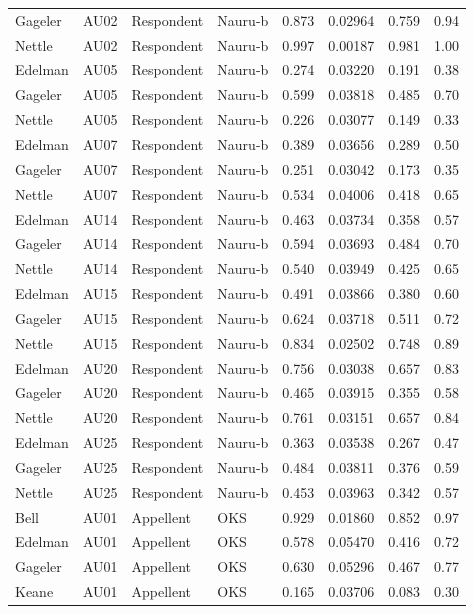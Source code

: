 \documentclass{monashthesis}
\begin{document}
\begin{center}
\begin{longtable}{llllllll}
Gageler & AU02 & Respondent & Nauru-b & 0.873 & 0.02964 & 0.759 & 0.94 \\
Nettle & AU02 & Respondent & Nauru-b & 0.997 & 0.00187 & 0.981 & 1.00 \\
Edelman & AU05 & Respondent & Nauru-b & 0.274 & 0.03220 & 0.191 & 0.38 \\
Gageler & AU05 & Respondent & Nauru-b & 0.599 & 0.03818 & 0.485 & 0.70 \\
Nettle & AU05 & Respondent & Nauru-b & 0.226 & 0.03077 & 0.149 & 0.33 \\
Edelman & AU07 & Respondent & Nauru-b & 0.389 & 0.03656 & 0.289 & 0.50 \\
Gageler & AU07 & Respondent & Nauru-b & 0.251 & 0.03042 & 0.173 & 0.35 \\
Nettle & AU07 & Respondent & Nauru-b & 0.534 & 0.04006 & 0.418 & 0.65 \\
Edelman & AU14 & Respondent & Nauru-b & 0.463 & 0.03734 & 0.358 & 0.57 \\
Gageler & AU14 & Respondent & Nauru-b & 0.594 & 0.03693 & 0.484 & 0.70 \\
Nettle & AU14 & Respondent & Nauru-b & 0.540 & 0.03949 & 0.425 & 0.65 \\
Edelman & AU15 & Respondent & Nauru-b & 0.491 & 0.03866 & 0.380 & 0.60 \\
Gageler & AU15 & Respondent & Nauru-b & 0.624 & 0.03718 & 0.511 & 0.72 \\
Nettle & AU15 & Respondent & Nauru-b & 0.834 & 0.02502 & 0.748 & 0.89 \\
Edelman & AU20 & Respondent & Nauru-b & 0.756 & 0.03038 & 0.657 & 0.83 \\
Gageler & AU20 & Respondent & Nauru-b & 0.465 & 0.03915 & 0.355 & 0.58 \\
Nettle & AU20 & Respondent & Nauru-b & 0.761 & 0.03151 & 0.657 & 0.84 \\
Edelman & AU25 & Respondent & Nauru-b & 0.363 & 0.03538 & 0.267 & 0.47 \\
Gageler & AU25 & Respondent & Nauru-b & 0.484 & 0.03811 & 0.376 & 0.59 \\
Nettle & AU25 & Respondent & Nauru-b & 0.453 & 0.03963 & 0.342 & 0.57 \\
Bell & AU01 & Appellent & OKS & 0.929 & 0.01860 & 0.852 & 0.97 \\
Edelman & AU01 & Appellent & OKS & 0.578 & 0.05470 & 0.416 & 0.72 \\
Gageler & AU01 & Appellent & OKS & 0.630 & 0.05296 & 0.467 & 0.77 \\
Keane & AU01 & Appellent & OKS & 0.165 & 0.03706 & 0.083 & 0.30 \\

\end{longtable}
\end{center}
\end{document}
